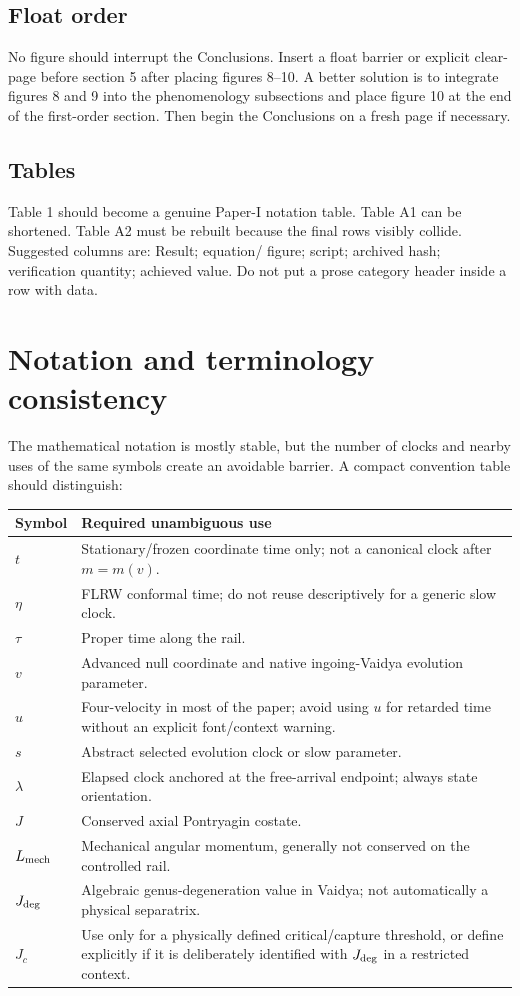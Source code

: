 \documentclass[11pt,a4paper]{article}
\begin{document}
\subsection{Float order}

No figure should interrupt the Conclusions.  Insert a float barrier or explicit clear-page before
section 5 after placing figures 8--10.  A better solution is to integrate figures 8 and 9 into the
phenomenology subsections and place figure 10 at the end of the first-order section.  Then begin the
Conclusions on a fresh page if necessary.

\subsection{Tables}

Table 1 should become a genuine Paper-I notation table.  Table A1 can be shortened.  Table A2 must
be rebuilt because the final rows visibly collide.  Suggested columns are: Result; equation/
figure; script; archived hash; verification quantity; achieved value.  Do not put a prose category
header inside a row with data.

\section{Notation and terminology consistency}

The mathematical notation is mostly stable, but the number of clocks and nearby uses of the same
symbols create an avoidable barrier.  A compact convention table should distinguish:

\begin{tabularx}{\textwidth}{@{}p{}X@{}}
\toprule
Symbol & Required unambiguous use \\
\midrule
$t$ & Stationary/frozen coordinate time only; not a canonical clock after $m=m(v)$. \\
$\eta$ & FLRW conformal time; do not reuse descriptively for a generic slow clock. \\
$\tau$ & Proper time along the rail. \\
$v$ & Advanced null coordinate and native ingoing-Vaidya evolution parameter. \\
$u$ & Four-velocity in most of the paper; avoid using $u$ for retarded time without an explicit
font/context warning. \\
$s$ & Abstract selected evolution clock or slow parameter. \\
$\lambda$ & Elapsed clock anchored at the free-arrival endpoint; always state orientation. \\
$J$ & Conserved axial Pontryagin costate. \\
$L_{\rm mech}$ & Mechanical angular momentum, generally not conserved on the controlled rail. \\
$J_{\rm deg}$ & Algebraic genus-degeneration value in Vaidya; not automatically a physical
separatrix. \\
$J_c$ & Use only for a physically defined critical/capture threshold, or define explicitly if it
is deliberately identified with $J_{\rm deg}$ in a restricted context. \\
\bottomrule
\end{tabularx}
\end{document}
